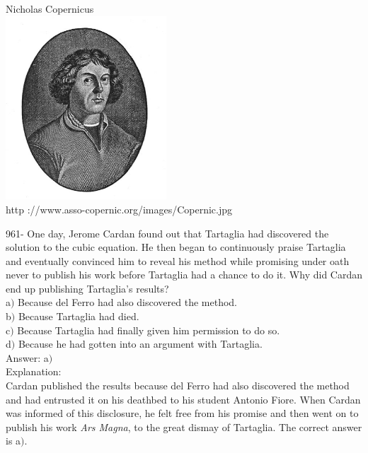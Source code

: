 \documentclass[letterpaper, 12pt]{article}
\begin{document}
        \begin{center}
        Nicholas Copernicus\\
    \includegraphics[width=6cm]{Copernic.eps}\\
        {\footnotesize http ://www.asso-copernic.org/images/Copernic.jpg}
    \end{center}

961- One day, Jerome Cardan found out that Tartaglia had discovered the solution to the cubic equation. He then began to continuously praise Tartaglia and eventually convinced him to reveal his method while promising under oath never to publish his work before Tartaglia had a chance to do it. Why did Cardan end up publishing Tartaglia's results?\\

a$)$ Because del Ferro had also discovered the method. \\
b$)$ Because Tartaglia had died.  \\
c$)$ Because Tartaglia had finally given him permission to do so.  \\
d$)$ Because he had gotten into an argument with Tartaglia. \\

Answer: a$)$\\

Explanation: \\
Cardan published the results because del Ferro had also discovered the method and had entrusted it on his deathbed to his student Antonio Fiore. When Cardan was informed of this disclosure, he felt free from his promise and then went on to publish his work {\sl Ars Magna}, to the great dismay of Tartaglia. The correct answer is a$)$.\\
\end{document}
